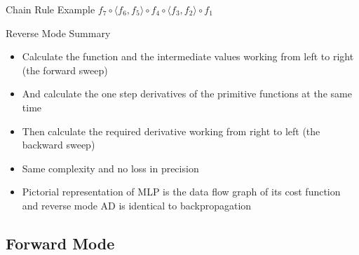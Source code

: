 \documentclass{beamer}
\begin{document}
\begin{frame}[fragile]{Chain Rule Example $f_7 \circ \langle f_6,
    f_5\rangle \circ f_4 \circ \langle f_3, f_2\rangle \circ f_1$}
\end{frame}

\begin{frame}[fragile]{Reverse Mode Summary}

\begin{itemize}
\pause
\item Calculate the function and the intermediate values working from
  left to right (the forward sweep)
\pause
\item And calculate the one step derivatives of the
  primitive functions at the same time
\pause
\item Then calculate the required derivative working from right to
  left (the backward sweep)
\pause
\item Same complexity and no loss in precision
\pause
\item Pictorial representation of MLP is the data flow graph of its cost
  function and reverse mode AD is identical to backpropagation
\end{itemize}

\end{frame}

\subsection{Forward Mode}
\end{document}
